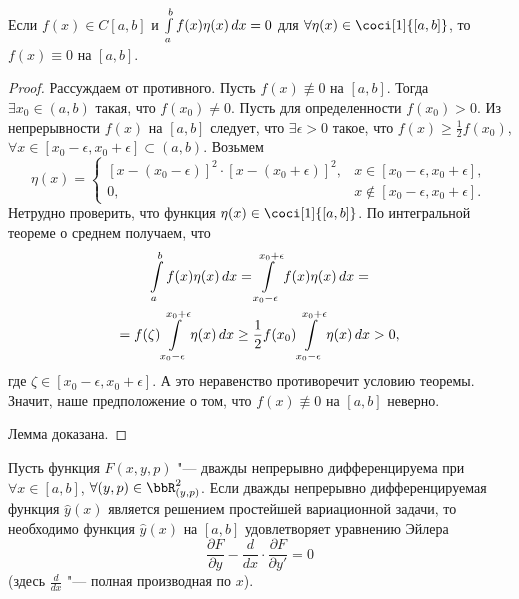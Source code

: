 \begin{lemm} \label{ch29.2lemm1}
Если $f(x)\in C[a,b]$ и $\int_a^b\limits f(x)\eta(x)\,dx=0$ для $\forall\eta(x)\in \coci[1]{[a,b]}$, то $f(x)\equiv 0$ на $[a,b]$.
\end{lemm}
\begin{proof}
Рассуждаем от противного. Пусть $f(x) \not\equiv  0$ на $[a,b]$. Тогда $\exists x_0\in(a,b)$ такая, что $f(x_0)\neq 0$. Пусть для определенности $f(x_0)>0$. Из непрерывности $f(x)$ на $[a,b]$ следует, что $\exists\epsilon>0$ такое, что $f(x)\geq\frac{1}{2}f(x_0)$, $\forall x\in [x_0-\epsilon,x_0+\epsilon]\subset (a,b).$ Возьмем
$$
\eta(x)=\begin{cases} 
[x-(x_0-\epsilon)]^2\cdot [x-(x_0+\epsilon)]^2, &x\in[x_0-\epsilon,x_0+\epsilon],\\
0, &x\notin[x_0-\epsilon,x_0+\epsilon].
\end{cases}
$$
Нетрудно проверить, что функция $\eta(x)\in \coci[1]{[a,b]}$. По интегральной теореме о среднем получаем, что
\begin{multline*}
\int_a^b\limits f(x)\eta(x)\,dx=\int\limits_{x_0-\epsilon}^{x_0+\epsilon} f(x)\eta(x)\,dx =\\= f(\zeta)\int\limits_{x_0-\epsilon}^{x_0+\epsilon}\eta(x)\,dx \geq \frac{1}{2} f(x_0)\int\limits_{x_0-\epsilon}^{x_0+\epsilon}  \eta (x)\,dx>0,
\end{multline*}
где $\zeta\in[x_0-\epsilon,x_0+\epsilon]$. А это неравенство противоречит условию теоремы. Значит, наше предположение о том, что $f(x)\not\equiv  0$ на $[a,b]$ неверно. 

Лемма доказана.
\end{proof}


\begin{thm}\label{ch29thm2}
Пусть функция $F(x,y,p)$ "--- дважды непрерывно дифференцируема при $\forall x\in[a,b]$, $\forall(y,p)\in \bbR^2_{(y,p)}$. Если дважды непрерывно дифференцируемая функция $\hat{y}(x)$ является решением простейшей вариационной задачи, то необходимо функция $\hat{y}(x)$ на $[a,b]$ удовлетворяет уравнению Эйлера
\begin{equation} \label{ch29eq5}
\frac{\partial F}{\partial y}-\frac{d}{dx}\cdot\frac{\partial F}{\partial y'}=0
\end{equation}
\textup{(}здесь $\frac{d}{dx}$ "--- полная производная по $x$\textup{)}.
\end{thm}

